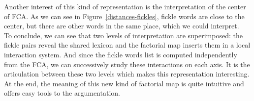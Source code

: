 \documentclass[preprint]{elsarticle}
\begin{document}
Another interest of this kind of representation is the interpretation of the center of FCA. As we can see in Figure~\ref{distances-fickles}, fickle words are close to the center, but there are other words in the same place, which we could interpret.\\

To conclude, we can see that two levels of interpretation are superimposed: the fickle pairs reveal the shared lexicon and the factorial map inserts them in a local interaction system. And since the fickle words list is computed independently from the FCA, we can successively study these interactions on each axis. It is the articulation between these two levels which makes this representation interesting. At the end, the meaning of this new kind of factorial map is quite intuitive and offers easy tools to the argumentation.
\end{document}
